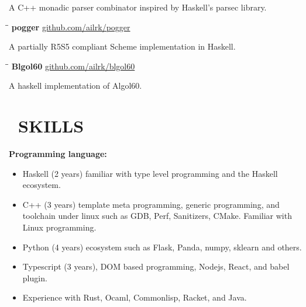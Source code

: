 \documentclass{resume}
\begin{document}
    \vspace{-0.3in}
    A C++ monadic parser combinator inspired by Haskell's parsec library.
    \vspace{-0.15in}

    \begin{tabbing}
        \hspace{2.4in}\= \hspace{2in}\= \kill
        {\bf pogger } \>               \>\url{github.com/ailrk/pogger}\\

    \end{tabbing}
    \vspace{-0.3in}
    A partially R5S5 compliant Scheme implementation in Haskell.
    \vspace{-0.15in}

    \begin{tabbing}
        \hspace{2.4in}\= \hspace{2in}\= \kill
        {\bf Blgol60 } \>               \>\url{github.com/ailrk/blgol60}\\

    \end{tabbing}
    \vspace{-0.3in}
    A haskell implementation of Algol60.
    \vspace{-0.1in}


\section{\faCogs\ SKILLS}

    \textbf{Programming language: }
    \begin{itemize}
        \item Haskell (2 years) familiar with type level programming and the Haskell ecosystem.
        \item C++ (3 years) template meta programming, generic programming, and toolchain under linux such as GDB, Perf, Sanitizers, CMake. Familiar with Linux programming.
        \item Python (4 years) ecosystem such as Flask, Panda, numpy, sklearn and others.
        \item Typescript (3 years), DOM based programming, Nodejs, React, and babel plugin.
        \item Experience with Rust, Ocaml, Commonlisp, Racket, and Java.
    \end{itemize}
\end{document}
